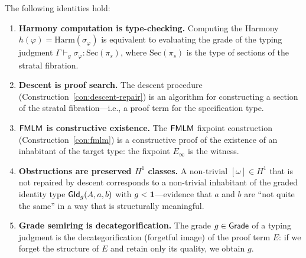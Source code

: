 \begin{theorem}
\label{thm:chh}
The following identities hold:
\begin{enumerate}[label=(\roman*)]
\item \textbf{Harmony computation is type-checking.}  Computing the
  Harmony $h(\varphi) = \mathrm{Harm}(\sigma_\varphi)$ is
  equivalent to evaluating the grade of the typing judgment
  $\Gamma \vdash_g \sigma_\varphi : \mathrm{Sec}(\pi_s)$, where
  $\mathrm{Sec}(\pi_s)$ is the type of sections of the stratal
  fibration.

\item \textbf{Descent is proof search.}  The descent procedure
  (Construction~\ref{con:descent-repair}) is an algorithm for
  constructing a section of the stratal fibration---i.e., a proof
  term for the specification type.

\item \textbf{$\mathsf{FMLM}$ is constructive existence.}  The $\mathsf{FMLM}$
  fixpoint construction (Construction~\ref{con:fmlm}) is a
  constructive proof of the existence of an inhabitant of the
  target type: the fixpoint $E_\infty$ is the witness.

\item \textbf{Obstructions are preserved $H^1$ classes.}  A
  non-trivial $[\omega] \in H^1$ that is not repaired by descent
  corresponds to a non-trivial inhabitant of the graded identity
  type $\mathsf{GId}_g(A, a, b)$ with $g < \mathbf{1}$---evidence that $a$ and
  $b$ are ``not quite the same'' in a way that is structurally
  meaningful.

\item \textbf{Grade semiring is decategorification.}  The grade
  $g \in \mathsf{Grade}$ of a typing judgment is the decategorification
  (forgetful image) of the proof term $E$: if we forget the
  structure of $E$ and retain only its quality, we obtain $g$.
\end{enumerate}
\end{theorem}

